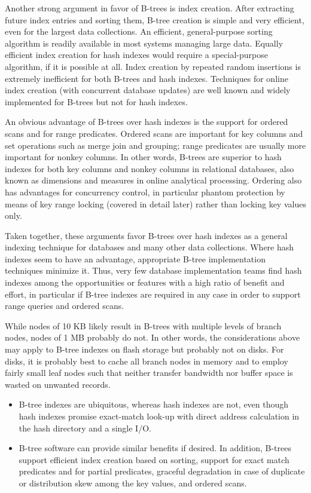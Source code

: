 Another strong argument in favor of B-trees is index creation. After
extracting future index entries and sorting them, B-tree creation is
simple and very efficient, even for the largest data collections. An
efficient, general-purpose sorting algorithm is readily available in
most systems managing large data. Equally efficient index creation for
hash indexes would require a special-purpose algorithm, if it is
possible at all. Index creation by repeated random insertions is
extremely inefficient for both B-trees and hash indexes. Techniques for
online index creation (with concurrent database updates) are well known
and widely implemented for B-trees but not for hash indexes.

An obvious advantage of B-trees over hash indexes is the support for
ordered scans and for range predicates. Ordered scans are important for
key columns and set operations such as merge join and grouping; range
predicates are usually more important for nonkey columns. In other
words, B-trees are superior to hash indexes for both key columns and
nonkey columns in relational databases, also known as dimensions and
measures in online analytical processing. Ordering also has advantages
for concurrency control, in particular phantom protection by means of
key range locking (covered in detail later) rather than locking key
values only.

Taken together, these arguments favor B-trees over hash indexes as a
general indexing technique for databases and many other data
collections. Where hash indexes seem to have an advantage, appropriate
B-tree implementation techniques minimize it. Thus, very few database
implementation teams find hash indexes among the opportunities or
features with a high ratio of benefit and effort, in particular if
B-tree indexes are required in any case in order to support range
queries and ordered scans.

While nodes of 10 KB likely result in B-trees with multiple levels of
branch nodes, nodes of 1 MB probably do not. In other words, the
considerations above may apply to B-tree indexes on flash storage but
probably not on disks. For disks, it is probably best to cache all
branch nodes in memory and to employ fairly small leaf nodes such that
neither transfer bandwidth nor buffer space is wasted on unwanted
records.

\begin{itemize}
\item
  B-tree indexes are ubiquitous, whereas hash indexes are not, even
  though hash indexes promise exact-match look-up with direct address
  calculation in the hash directory and a single I/O.
\item
  B-tree software can provide similar benefits if desired. In addition,
  B-trees support efficient index creation based on sorting, support for
  exact match predicates and for partial predicates, graceful
  degradation in case of duplicate or distribution skew among the key
  values, and ordered scans.
\end{itemize}

